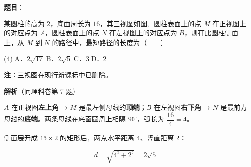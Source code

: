 \begin{answer}

\textbf{题目}：

某圆柱的高为 $2$，底面周长为 $16$，其三视图如图。圆柱表面上的点 $M$ 在正视图上的对应点为 $A$，圆柱表面上的点 $N$ 在左视图上的对应点为 $B$，则在此圆柱侧面上，从 $M$ 到 $N$ 的路径中，最短路径的长度为\mbox{（　　）}
\nopagebreak[4]
\begin{center}\end{center}
\nopagebreak[4]
\begin{gkopts}(4)
\task A．$2\sqrt{17}$
\task B．$2\sqrt5$
\task C．$3$
\task D．$2$
\end{gkopts}

\begin{gktip}
\textbf{注}：三视图在现行新课标中已删除。
\end{gktip}

\textbf{解析}（同理科卷第 7 题）

$A$ 在正视图\textbf{左上角} → $M$ 是最左侧母线的\textbf{顶端}；$B$ 在左视图\textbf{右下角} → $N$ 是最前方母线的\textbf{底端}。两条母线在底面圆周上相隔 $90^\circ$，弧长为 $\dfrac{16}4=4$。

侧面展开成 $16\times2$ 的矩形后，两点水平距离 $4$、竖直距离 $2$：

\nopagebreak[4]
\[d=\sqrt{4^{2}+2^{2}}=2\sqrt5\]


\par\medskip

\end{answer}
